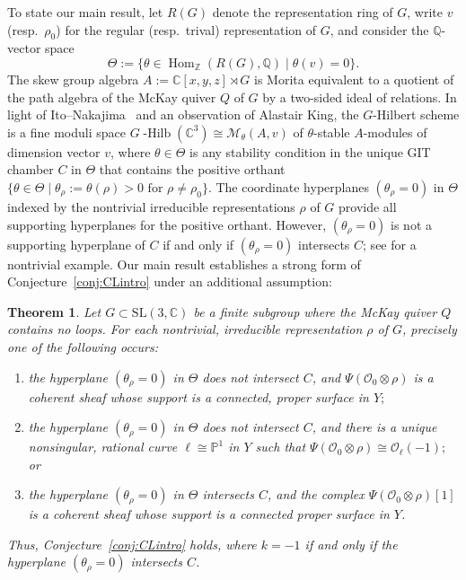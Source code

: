 \documentclass[11pt,reqno]{amsart}
\numberwithin{equation}{section}
\newtheorem{theorem}{Theorem}[section]
\theoremstyle{definition}
\newcommand{\QQ}{\ensuremath{\mathbb{Q}}}
\newcommand{\ghilb}{\ensuremath{G}\operatorname{-Hilb}}
\newcommand{\Hom}{\operatorname{Hom}}
\newcommand{\0}{\operatorname{0}}
\begin{document}
 To state our main result, let $R(G)$ denote the representation ring of $G$, write $v$ (resp.\ $\rho_0$) for the regular (resp.\ trival) representation of $G$, and consider the $\QQ$-vector space 
 \[
 \Theta:=\{\theta\in \Hom_{\mathbb{Z}}(R(G),\mathbb{Q}) \mid \theta(v)=0\}.
 \]
 The skew group algebra $A:= \mathbb{C}[x,y,z]\rtimes G$ is Morita equivalent to a quotient of the path algebra of the McKay quiver $Q$ of $G$ by a two-sided ideal of relations. In light of Ito--Nakajima~\cite{ItoNakajima00} and an observation of Alastair King, the $G$-Hilbert scheme is a fine moduli space $\ghilb(\mathbb{C}^3)\cong \mathcal{M}_\theta(A,v)$ 
  of $\theta$-stable $A$-modules of dimension vector $v$, where $\theta\in \Theta$ is any stability condition in the unique GIT chamber $C$ in $\Theta$ that contains the positive orthant $\big\{\theta\in \Theta \mid \theta_\rho:=\theta(\rho) > 0 \text{ for }\rho\neq \rho_0\big\}$. The coordinate hyperplanes $(\theta_\rho=0)$ in $\Theta$ indexed by the nontrivial irreducible representations $\rho$ of $G$ provide all supporting hyperplanes for the positive orthant. However, $(\theta_\rho=0)$ is not a supporting hyperplane of $C$ if and only if $(\theta_\rho=0)$ intersects $C$; see \cite[Example~9.6]{CI04} for a nontrivial example.
  Our main result establishes a strong form of Conjecture~\ref{conj:CLintro} under an additional assumption: 
 
 \begin{theorem}
 \label{thm:mainintro}
    Let $G\subset \mathrm{SL}(3,\mathbb{C})$ be a finite subgroup where the McKay quiver $Q$ contains no loops.  For each nontrivial, irreducible representation $\rho$ of $G$, precisely one of the following occurs:
    \begin{enumerate}
      \item[\ensuremath{(+)}] the hyperplane $(\theta_\rho=0)$ in $\Theta$ does not intersect $C$, and 
      $\Psi(\mathcal{O}_0\otimes \rho)$ is a coherent sheaf whose support is a connected, proper surface in $Y;$
      \item[\ensuremath{(0)}] the hyperplane $(\theta_\rho=0)$ in $\Theta$ does not intersect $C$, and 
      there is a unique nonsingular, rational curve $\ell\cong \mathbb{P}^1$ in $Y$ such that $\Psi(\mathcal{O}_0\otimes \rho)\cong \mathcal{O}_{\ell}(-1);$ or 
     \item[\ensuremath{(-)}]  the hyperplane $(\theta_\rho=0)$ in $\Theta$ intersects $C$, and the complex $\Psi(\mathcal{O}_0\otimes \rho)[1]$ is a coherent sheaf whose support is a connected proper surface in $Y$.    
     \end{enumerate}  
  Thus, Conjecture~\ref{conj:CLintro} holds, where $k=-1$ if and only if  the hyperplane $(\theta_\rho=0)$ intersects $C$.
  \end{theorem}
\end{document}
